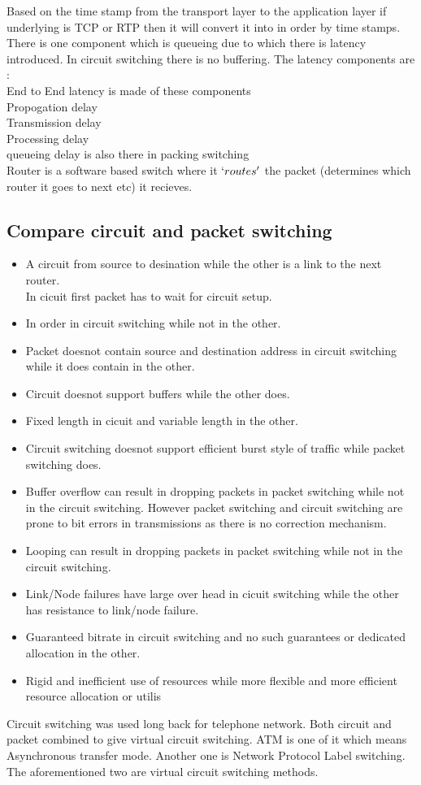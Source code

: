 \documentclass[solution,addpoints,12pt]{exam}
\begin{document}
Based on the time stamp from the transport layer to the application layer
if underlying is TCP or RTP then it will convert it into in order by
time stamps.
There is one component which is queueing due to which there is
latency introduced. In circuit switching there is no buffering.
The latency components are :\\
End to End latency is made of these components\\
Propogation delay\\
Transmission delay\\
Processing delay\\
queueing delay is also there in packing switching\\
Router is a software based switch where it $\lq routes \rq$ the packet
(determines which router it goes to next etc) it recieves.

\subsection{Compare circuit and packet switching}
\begin{itemize}
\item A circuit from source to desination while the other is a
link to the next router.\\
In cicuit first packet has to wait for circuit setup.\\
\item In order in circuit switching while not in the other.\\
\item Packet doesnot contain source and destination address in circuit
switching while it does contain in the other.
\item Circuit doesnot support buffers while the other does.
\item Fixed length in cicuit and variable length in the other.
\item Circuit switching doesnot support efficient burst style of traffic while
packet switching does.
\item Buffer overflow can result in dropping packets
in packet switching while not in the circuit switching. However
packet switching and circuit switching are prone to bit errors in
transmissions as there is no correction mechanism.
\item Looping can result in dropping packets
in packet switching while not in the circuit switching.
\item Link/Node failures have large over head in cicuit switching while
the other has resistance to link/node failure.
\item Guaranteed bitrate in circuit switching and no such guarantees or
dedicated allocation in the other.
\item Rigid and inefficient use of resources while more flexible
and more efficient resource allocation or utilis
\end{itemize}
Circuit switching was used long back for telephone network.
Both circuit and packet combined to give virtual circuit
switching. ATM is one of it which means Asynchronous transfer mode.
Another one is Network Protocol Label switching. The aforementioned two are
virtual circuit switching methods.\\
\end{document}
